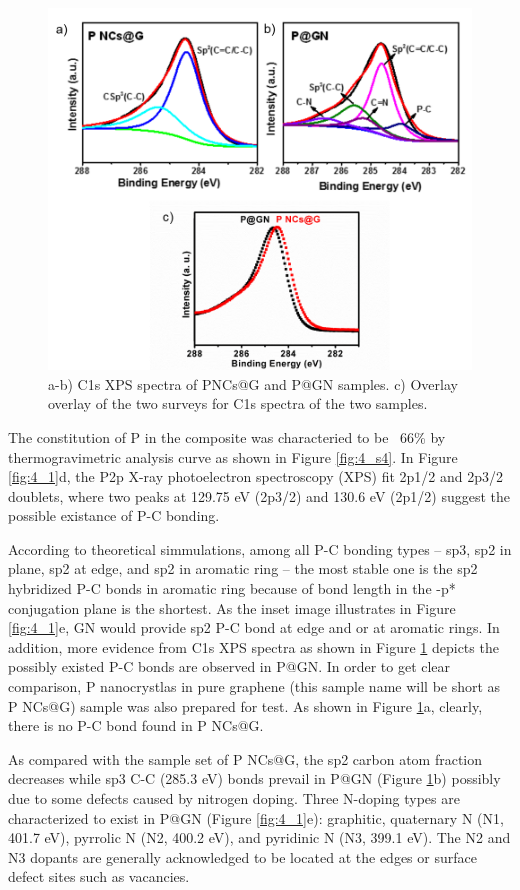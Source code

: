 \begin{figure}  
\centering
\includegraphics[width=320pt]{figures/figure4_s5}
\caption[C1s XPS spectra comparison]
{a-b) C1s XPS spectra of PNCs@G and P@GN samples. c) Overlay overlay of the two surveys for C1s spectra of the two samples. 
\label{fig:4_s5}}
\end{figure}

The constitution of P in the composite was characteried to be ~66\% by thermogravimetric analysis curve as shown in Figure \ref{fig:4_s4}. In Figure \ref{fig:4_1}d, the P2p X-ray photoelectron spectroscopy (XPS) fit 2p1/2 and 2p3/2 doublets, where two peaks at 129.75 eV (2p3/2) and 130.6 eV (2p1/2) suggest the possible existance of P-C bonding.\cite{Jiao2014b,Niu2014b,Zhang2013b} 

According to theoretical simmulations,\cite{Sun2014b,Claeyssens2009b} among all P-C bonding types -- sp3, sp2 in plane, sp2 at edge, and sp2 in aromatic ring -- the most stable one is the sp2 hybridized P-C bonds in aromatic ring because of bond length in the \pi-p* conjugation plane is the shortest. As the inset image illustrates in Figure \ref{fig:4_1}e, GN would provide sp2 P-C bond at edge and or at aromatic rings. In addition, more evidence from C1s XPS spectra as shown in Figure \ref{fig:4_s5} depicts the possibly existed P-C bonds are observed in P@GN. In order to get clear comparison, P nanocrystlas in pure graphene (this sample name will be short as P NCs@G) sample was also prepared for test. As shown in Figure \ref{fig:4_s5}a, clearly, there is no P-C bond found in P NCs@G. 

As compared with the sample set of P NCs@G, the sp2 carbon atom fraction decreases while sp3 C-C (285.3 eV) bonds prevail in P@GN (Figure \ref{fig:4_s5}b) possibly due to some defects caused by nitrogen doping. Three N-doping types are characterized to exist in P@GN (Figure \ref{fig:4_1}e): graphitic, quaternary N (N1, 401.7 eV), pyrrolic N (N2, 400.2 eV), and pyridinic N (N3, 399.1 eV).\cite{Roth1947b,Wang2012e,Wang2014f,Wang2013i} The N2 and N3 dopants are generally acknowledged to be located at the edges or surface defect sites such as vacancies.\\

